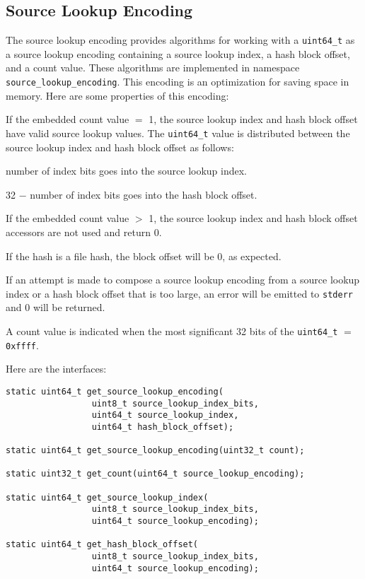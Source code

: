 \documentclass[12pt,twoside]{article}
\begin{document}
\subsection{Source Lookup Encoding}
The source lookup encoding provides algorithms for working with a
\texttt{uint64\_t}
as a source lookup encoding containing a source lookup index,
a hash block offset, and a count value.
These algorithms are
implemented in namespace \texttt{source\_lookup\_encoding}.
This encoding is an optimization for saving space in memory.
Here are some properties of this encoding:
\begin{compactitem}
\item If the embedded count value $=$ 1,
the source lookup index and hash block offset
have valid source lookup values.
The \texttt{uint64\_t} value is distributed between the
source lookup index and hash block offset as follows:
  \begin{compactitem}
  \item number of index bits goes into the source lookup index.
  \item 32 $-$ number of index bits goes into the hash block offset.
  \end{compactitem}
\item If the embedded count value $>$ 1,
the source lookup index and hash block offset accessors
are not used and return 0.
\item If the hash is a file hash, the block offset will be 0, as expected.
\item If an attempt is made to compose a source lookup encoding
from a source lookup index or a hash block offset
that is too large, an error will be emitted to \texttt{stderr}
and 0 will be returned.
\item A count value is indicated when the most significant 32 bits
of the \texttt{uint64\_t} $=$ \texttt{0xffff}.
\end{compactitem}

Here are the interfaces:
\begin{small}
\begin{verbatim}
static uint64_t get_source_lookup_encoding(
                 uint8_t source_lookup_index_bits,
                 uint64_t source_lookup_index,
                 uint64_t hash_block_offset);

static uint64_t get_source_lookup_encoding(uint32_t count);

static uint32_t get_count(uint64_t source_lookup_encoding);

static uint64_t get_source_lookup_index(
                 uint8_t source_lookup_index_bits,
                 uint64_t source_lookup_encoding);

static uint64_t get_hash_block_offset(
                 uint8_t source_lookup_index_bits,
                 uint64_t source_lookup_encoding);
\end{verbatim}
\end{small}
\end{document}
